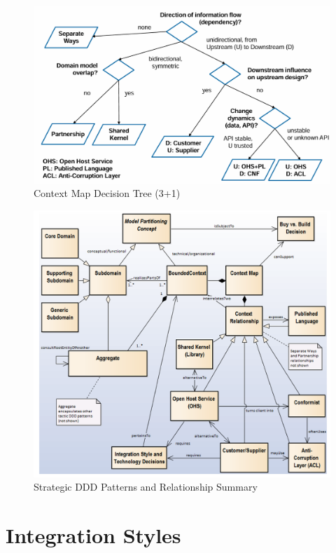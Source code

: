 \documentclass[../Main.tex]{subfiles}
\begin{document}
\begin{figure}[H]
    \centering
    \includegraphics[width=1\linewidth]{Images/context-map-decision-tree.png}
    \caption{Context Map Decision Tree (3+1)}
\end{figure}

\begin{figure}[H]
    \centering
    \includegraphics[width=1\linewidth]{Images/strategic-ddd-summary.png}
    \caption{Strategic DDD Patterns and Relationship Summary}
\end{figure}

\newpage
\section{Integration Styles}
\end{document}

